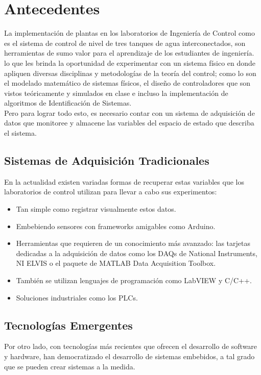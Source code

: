 \section{Antecedentes}
La implementación de plantas en los laboratorios de Ingeniería de Control como es el sistema de control de nivel de tres tanques de agua interconectados, son herramientas de sumo valor para el aprendizaje de los estudiantes de ingeniería. lo que les brinda la oportunidad de experimentar con un sistema físico en donde apliquen diversas disciplinas y metodologías de la teoría del control; como lo son el modelado matemático de sistemas físicos, el diseño de controladores que son vistos teóricamente y simulados en clase e incluso la implementación de algoritmos de Identificación de Sistemas.\\

Pero para lograr todo esto, es necesario contar con un sistema de adquisición de datos que monitoree y almacene las variables del espacio de estado que describa el sistema.

\subsection{Sistemas de Adquisición Tradicionales}
    En la actualidad existen variadas formas de recuperar estas variables que los laboratorios de control utilizan para llevar a cabo sus experimentos:

     \begin{itemize}
        \item Tan simple como registrar visualmente estos datos.
        \item Embebiendo sensores con frameworks amigables como Arduino.
        \item Herramientas que requieren de un conocimiento más avanzado: las tarjetas dedicadas a la adquisición de datos como los DAQs de National Instruments, NI ELVIS o el paquete de MATLAB Data Acquisition Toolbox. 
        \item También se utilizan lenguajes de programación como LabVIEW y C/C++.
        \item Soluciones industriales como los PLCs.
     \end{itemize}

\subsection{Tecnologías Emergentes}
     Por otro lado, con tecnologías más recientes que ofrecen el desarrollo de software y hardware, han democratizado el desarrollo de sistemas embebidos, a tal grado que se pueden crear sistemas a la medida.

